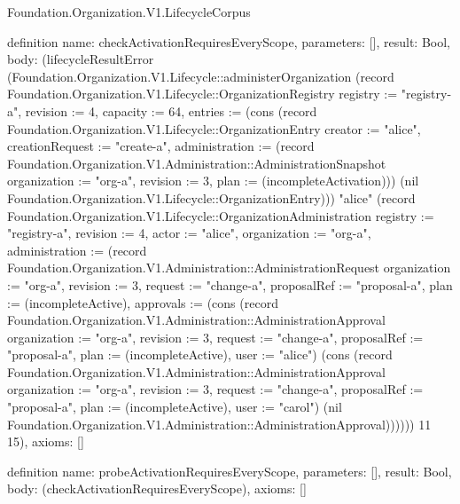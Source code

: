 \begin{lexlean}{Foundation.Organization.V1.LifecycleCorpus}
\begin{semanticmodule}
definition{
  name: checkActivationRequiresEveryScope,
  parameters: [],
  result: Bool,
  body: (lifecycleResultError (Foundation.Organization.V1.Lifecycle::administerOrganization (record Foundation.Organization.V1.Lifecycle::OrganizationRegistry {registry := "registry-a", revision := 4, capacity := 64, entries := (cons (record Foundation.Organization.V1.Lifecycle::OrganizationEntry {creator := "alice", creationRequest := "create-a", administration := (record Foundation.Organization.V1.Administration::AdministrationSnapshot {organization := "org-a", revision := 3, plan := (incompleteActivation)})}) (nil Foundation.Organization.V1.Lifecycle::OrganizationEntry))}) "alice" (record Foundation.Organization.V1.Lifecycle::OrganizationAdministration {registry := "registry-a", revision := 4, actor := "alice", organization := "org-a", administration := (record Foundation.Organization.V1.Administration::AdministrationRequest {organization := "org-a", revision := 3, request := "change-a", proposalRef := "proposal-a", plan := (incompleteActive), approvals := (cons (record Foundation.Organization.V1.Administration::AdministrationApproval {organization := "org-a", revision := 3, request := "change-a", proposalRef := "proposal-a", plan := (incompleteActive), user := "alice"}) (cons (record Foundation.Organization.V1.Administration::AdministrationApproval {organization := "org-a", revision := 3, request := "change-a", proposalRef := "proposal-a", plan := (incompleteActive), user := "carol"}) (nil Foundation.Organization.V1.Administration::AdministrationApproval)))})})) 11 15),
  axioms: []
}

definition{
  name: probeActivationRequiresEveryScope,
  parameters: [],
  result: Bool,
  body: (checkActivationRequiresEveryScope),
  axioms: []
}


\end{semanticmodule}
\end{lexlean}
